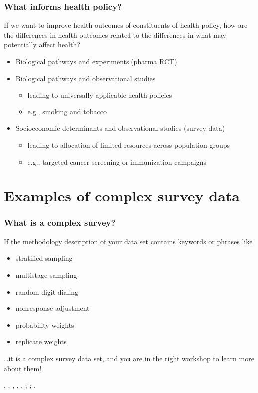 \documentclass{beamer}
\begin{document}
\begin{frame}\frametitle{What informs health policy?}

If we want to improve health outcomes of constituents of health policy,
how are the differences in health outcomes related to
the differences in what may potentially affect health?

\begin{itemize}
    \item Biological pathways and experiments (pharma RCT)
    \item Biological pathways and observational studies
    \begin{itemize}
        \item leading to universally applicable health policies
        \item e.g., smoking and tobacco
    \end{itemize}
    \item Socioeconomic determinants and observational studies (survey data)
    \begin{itemize}
        \item leading to allocation of limited resources across population groups
        \item e.g., targeted cancer screening or immunization campaigns
    \end{itemize}
\end{itemize}

\end{frame}

\section{Examples of complex survey data}

\begin{frame}\frametitle{What is a complex survey?}

If the methodology description of your data set contains keywords or phrases like
\begin{itemize}
    \item stratified sampling
    \item multistage sampling
    \item random digit dialing
    \item nonresponse adjustment
    \item probability weights
    \item replicate weights
\end{itemize}

\ldots it is a complex survey data set, and you are in the right workshop to learn more about them!

\medskip

\citet{korn:graubard:1999}, \citet{heeringa:west:berglund:2017}, \citet{lumley:2010},
\citet{chambers:skinner:2003}, \citet{pfeffermann:rao:2009}, \citet{wu:thompson:2020};
\citet{skinner:wakefield:2017};
\citet{west:sakshaug:aure:2016}.

\end{frame}
\end{document}
